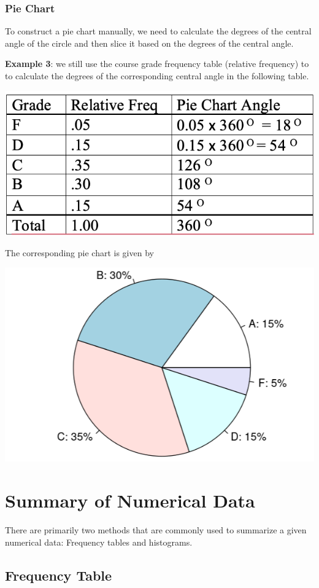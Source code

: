 \documentclass[
]{book}
\begin{document}
\hypertarget{pie-chart}{%
\subsubsection{Pie Chart}\label{pie-chart}}

To construct a pie chart manually, we need to calculate the degrees of the central angle of the circle and then slice it based on the degrees of the central angle.

\textbf{Example 3}: we still use the course grade frequency table (relative frequency) to to calculate the degrees of the corresponding central angle in the following table.

\begin{center}\includegraphics[width=0.5\linewidth]{week01/pieChartTable} \end{center}

The corresponding pie chart is given by

\begin{center}\includegraphics[width=0.5\linewidth]{week01/pieChart} \end{center}

\hypertarget{summary-of-numerical-data}{%
\section{Summary of Numerical Data}\label{summary-of-numerical-data}}

There are primarily two methods that are commonly used to summarize a given numerical data: Frequency tables and histograms.

\hypertarget{frequency-table}{%
\subsection{Frequency Table}\label{frequency-table}}
\end{document}
